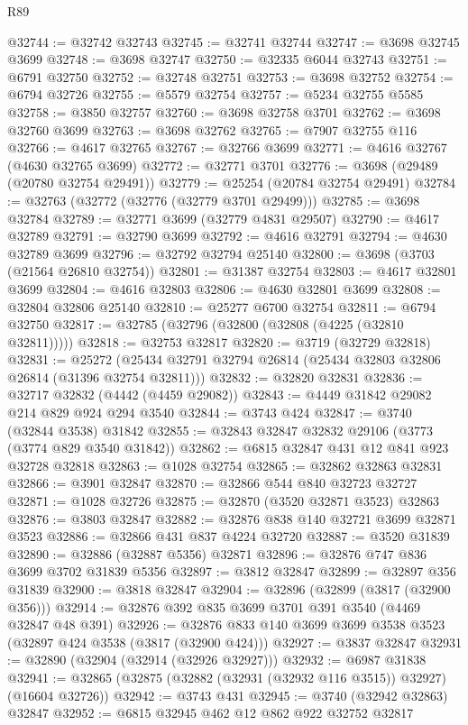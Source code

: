 \begin{lexlean}{R89}
\begin{coremodule}
@32744 := @32742 @32743
@32745 := @32741 @32744
@32747 := @3698 @32745 @3699
@32748 := @3698 @32747
@32750 := @32335 @6044 @32743
@32751 := @6791 @32750
@32752 := @32748 @32751
@32753 := @3698 @32752
@32754 := @6794 @32726
@32755 := @5579 @32754
@32757 := @5234 @32755 @5585
@32758 := @3850 @32757
@32760 := @3698 @32758 @3701
@32762 := @3698 @32760 @3699
@32763 := @3698 @32762
@32765 := @7907 @32755 @116
@32766 := @4617 @32765
@32767 := @32766 @3699
@32771 := @4616 @32767 (@4630 @32765 @3699)
@32772 := @32771 @3701
@32776 := @3698 (@29489 (@20780 @32754 @29491))
@32779 := @25254 (@20784 @32754 @29491)
@32784 := @32763 (@32772 (@32776 (@32779 @3701 @29499)))
@32785 := @3698 @32784
@32789 := @32771 @3699 (@32779 @4831 @29507)
@32790 := @4617 @32789
@32791 := @32790 @3699
@32792 := @4616 @32791
@32794 := @4630 @32789 @3699
@32796 := @32792 @32794 @25140
@32800 := @3698 (@3703 (@21564 @26810 @32754))
@32801 := @31387 @32754
@32803 := @4617 @32801 @3699
@32804 := @4616 @32803
@32806 := @4630 @32801 @3699
@32808 := @32804 @32806 @25140
@32810 := @25277 @6700 @32754
@32811 := @6794 @32750
@32817 := @32785 (@32796 (@32800 (@32808 (@4225 (@32810 @32811)))))
@32818 := @32753 @32817
@32820 := @3719 (@32729 @32818)
@32831 := @25272 (@25434 @32791 @32794 @26814 (@25434 @32803 @32806 @26814 (@31396 @32754 @32811)))
@32832 := @32820 @32831
@32836 := @32717 @32832 (@4442 (@4459 @29082))
@32843 := @4449 @31842 @29082 @214 @829 @924 @294 @3540
@32844 := @3743 @424
@32847 := @3740 (@32844 @3538) @31842
@32855 := @32843 @32847 @32832 @29106 (@3773 (@3774 @829 @3540 @31842))
@32862 := @6815 @32847 @431 @12 @841 @923 @32728 @32818
@32863 := @1028 @32754
@32865 := @32862 @32863 @32831
@32866 := @3901 @32847
@32870 := @32866 @544 @840 @32723 @32727
@32871 := @1028 @32726
@32875 := @32870 (@3520 @32871 @3523) @32863
@32876 := @3803 @32847
@32882 := @32876 @838 @140 @32721 @3699 @32871 @3523
@32886 := @32866 @431 @837 @4224 @32720
@32887 := @3520 @31839
@32890 := @32886 (@32887 @5356) @32871
@32896 := @32876 @747 @836 @3699 @3702 @31839 @5356
@32897 := @3812 @32847
@32899 := @32897 @356 @31839
@32900 := @3818 @32847
@32904 := @32896 (@32899 (@3817 (@32900 @356)))
@32914 := @32876 @392 @835 @3699 @3701 @391 @3540 (@4469 @32847 @48 @391)
@32926 := @32876 @833 @140 @3699 @3699 @3538 @3523 (@32897 @424 @3538 (@3817 (@32900 @424)))
@32927 := @3837 @32847
@32931 := @32890 (@32904 (@32914 (@32926 @32927)))
@32932 := @6987 @31838
@32941 := @32865 (@32875 (@32882 (@32931 (@32932 @116 @3515)) @32927) (@16604 @32726))
@32942 := @3743 @431
@32945 := @3740 (@32942 @32863) @32847
@32952 := @6815 @32945 @462 @12 @862 @922 @32752 @32817

\end{coremodule}
\end{lexlean}
